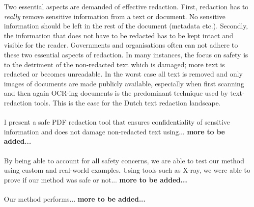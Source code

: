 Two essential aspects are demanded of effective redaction. First, redaction has to \textit{really} remove sensitive information from a text or document. No sensitive information should be left in the rest of the document (metadata etc.). Secondly, the information that does not have to be redacted has to be kept intact and visible for the reader. Governments and organisations often can not adhere to these two essential aspects of redaction. In many instances, the focus on safety is to the detriment of the non-redacted text which is damaged; more text is redacted or becomes unreadable. In the worst case all text is removed and only images of documents are made publicly available, especially when first scanning and then again OCR-ing documents is the predominant technique used by text-redaction tools. This is the case for the Dutch text redaction landscape.
\\\\
I present a safe PDF redaction tool that ensures confidentiality of sensitive information and does not damage non-redacted text using... \textbf{more to be added...}
\\\\
By being able to account for all safety concerns, we are able to test our method using custom and real-world examples. Using tools such as X-ray, we were able to prove if our method was safe or not... \textbf{more to be added...}
\\\\
Our method performs... \textbf{more to be added...}



